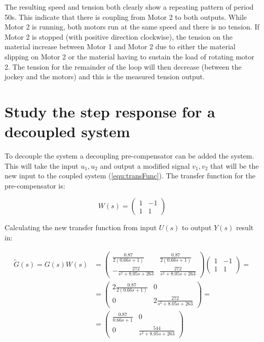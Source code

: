 \documentclass[a4paper, titlepage]{article}
\begin{document}
The resulting speed and tension both clearly show a repeating pattern of period 50s.
This indicate that there is coupling from Motor 2 to both outputs.
While Motor 2 is running, both motors run at the same speed and there is no tension.
If Motor 2 is stopped (with positive direction clockwise), the tension on the material increase between Motor 1 and Motor 2 due to either the material slipping on Motor 2 or the material having to sustain the load of rotating motor 2.
The tension for the remainder of the loop will then decrease (between the jockey and the motors) and this is the measured tension output.

\section{Study the step response for a decoupled system}
To decouple the system a decoupling pre-compensator can be added the system.
This will take the input $u_1, u_2$ and output a modified signal $v_1, v_2$ that will be the new input to the coupled system (\ref{equ:transFunc}).
The transfer function for the pre-compensator is:

\begin{equation}
W(s) = 
\begin{pmatrix}
1 & -1 \\ 1 & 1
\end{pmatrix}
\end{equation}

Calculating the new transfer function from input $U(s)$ to output $Y(s)$ result in:

\begin{equation}
\begin{split}
\tilde{G}(s) = G(s)W(s) &= 
\begin{pmatrix}
\frac{0.87}{2(0.66s + 1)} & \frac{0.87}{2(0.66s + 1)} \\[6pt]
-\frac{272}{s^2 + 8.05s + 263} & \frac{272}{s^2 + 8.05s + 263}
\end{pmatrix}
\begin{pmatrix}
1 & -1 \\ 1 & 1
\end{pmatrix} = \\
&= \begin{pmatrix}
2\frac{0.87}{2(0.66s + 1)} & 0 \\[6pt]
0 & 2\frac{272}{s^2 + 8.05s + 263}
\end{pmatrix} = \\
&= \begin{pmatrix}
\frac{0.87}{0.66s + 1} & 0 \\[6pt]
0 & \frac{544}{s^2 + 8.05s + 263}
\end{pmatrix}
\end{split}
\label{equ:decoupled}
\end{equation}
\end{document}
